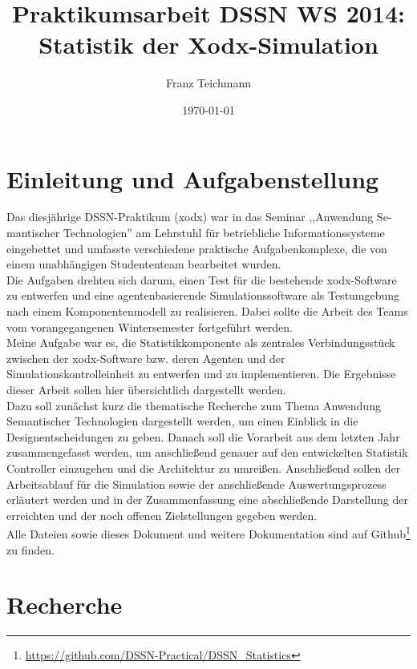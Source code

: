 \documentclass{article}
\title{Praktikumsarbeit DSSN WS 2014: \\ Statistik der Xodx-Simulation}
\author{Franz Teichmann}
\date{\today}
\begin{document}
\maketitle

\tableofcontents
\newpage


\section{Einleitung und Aufgabenstellung}

Das diesjährige DSSN-Praktikum (xodx) war in das Seminar ,,Anwendung Se-mantischer Technologien'' am Lehrstuhl für betriebliche Informationssysteme eingebettet und umfasste verschiedene praktische Aufgabenkomplexe, die von einem unabhängigen Studententeam bearbeitet wurden.\\
Die Aufgaben drehten sich darum, einen Test für die bestehende xodx-Software zu entwerfen und eine agentenbasierende Simulationssoftware als Testumgebung nach einem Komponentenmodell zu realisieren. Dabei sollte die Arbeit des Teams vom vorangegangenen Wintersemester fortgeführt werden.\\
Meine Aufgabe war es, die Statistikkomponente als zentrales Verbindungsstück zwischen der xodx-Software bzw. deren Agenten und der Simulationskontrolleinheit zu entwerfen und zu implementieren. Die Ergebnisse dieser Arbeit sollen hier übersichtlich dargestellt werden.\\
Dazu soll zunächst kurz die thematische Recherche zum Thema Anwendung Semantischer Technologien dargestellt werden, um einen Einblick in die Designentscheidungen zu geben. Danach soll die Vorarbeit aus dem letzten Jahr zusammengefasst werden, um anschließend genauer auf den entwickelten Statistik Controller einzugehen und die Architektur zu umreißen. Anschließend sollen der Arbeitsablauf für die Simulation sowie der anschließende Auswertungsprozess erläutert werden und in der Zusammenfassung eine abschließende Darstellung der erreichten und der noch offenen Zielstellungen gegeben werden.\\
Alle Dateien sowie dieses Dokument und weitere Dokumentation sind auf Github\footnote{\url{https://github.com/DSSN-Practical/DSSN_Statistics}} zu finden.

\section{Recherche}
\end{document}
